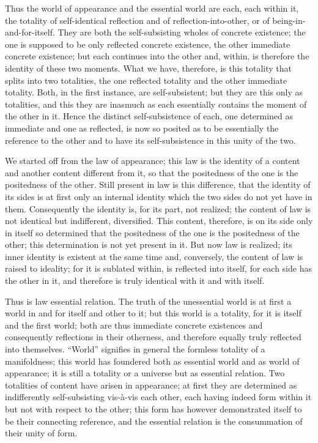 Thus the world of appearance and the essential world are
each, each within it, the totality of
self-identical reflection and of reflection-into-other,
or of being-in-and-for-itself.
They are both the self-subsisting wholes of concrete existence;
the one is supposed to be only reflected concrete existence,
the other immediate concrete existence;
but each continues into the other and, within, is
therefore the identity of these two moments.
What we have, therefore, is this totality
that splits into two totalities,
the one reflected totality and the other immediate totality.
Both, in the first instance, are self-subsistent;
but they are this only as totalities,
and this they are inasmuch as each essentially contains
the moment of the other in it.
Hence the distinct self-subsistence of each,
one determined as immediate and one as reflected,
is now so posited as to be essentially the reference to the other
and to have its self-subsistence in this unity of the two.

We started off from the law of appearance;
this law is the identity of a content and another content different from it,
so that the positedness of the one is the positedness of the other.
Still present in law is this difference,
that the identity of its sides is at first only an internal identity
which the two sides do not yet have in them.
Consequently the identity is, for its part, not realized;
the content of law is not identical but indifferent, diversified.
This content, therefore, is on its side only in itself so determined
that the positedness of the one is the positedness of the other;
this determination is not yet present in it.
But now law is realized; its inner identity is existent at the same time
and, conversely, the content of law is raised to ideality;
for it is sublated within, is reflected into itself,
for each side has the other in it,
and therefore is truly identical with it and with itself.

Thus is law essential relation.
The truth of the unessential world is at first
a world in and for itself and other to it;
but this world is a totality,
for it is itself and the first world;
both are thus immediate concrete existences
and consequently reflections in their otherness,
and therefore equally truly reflected into themselves.
“World” signifies in general 
the formless totality of a manifoldness;
this world has foundered both as essential world 
and as world of appearance;
it is still a totality or a universe 
but as essential relation.
Two totalities of content have arisen in appearance;
at first they are determined as
indifferently self-subsisting vis-à-vis each other,
each having indeed form within it
but not with respect to the other;
this form has however demonstrated
itself to be their connecting reference,
and the essential relation is
the consummation of their unity of form.

